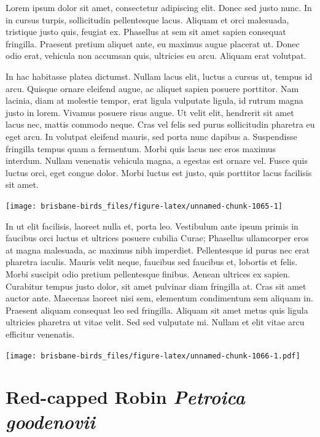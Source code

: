 \documentclass[]{book}
\let\origfigure\figure
\let\endorigfigure\endfigure
\renewenvironment{figure}[1][2] {
  \expandafter\origfigure\expandafter[H]
} {
  \endorigfigure
}
\begin{document}
Lorem ipsum dolor sit amet, consectetur adipiscing elit. Donec sed justo
nunc. In in cursus turpis, sollicitudin pellentesque lacus. Aliquam et
orci malesuada, tristique justo quis, feugiat ex. Phasellus at sem sit
amet sapien consequat fringilla. Praesent pretium aliquet ante, eu
maximus augue placerat ut. Donec odio erat, vehicula non accumsan quis,
ultricies eu arcu. Aliquam erat volutpat.

In hac habitasse platea dictumst. Nullam lacus elit, luctus a cursus ut,
tempus id arcu. Quisque ornare eleifend augue, ac aliquet sapien posuere
porttitor. Nam lacinia, diam at molestie tempor, erat ligula vulputate
ligula, id rutrum magna justo in lorem. Vivamus posuere risus augue. Ut
velit elit, hendrerit sit amet lacus nec, mattis commodo neque. Cras vel
felis sed purus sollicitudin pharetra eu eget arcu. In volutpat eleifend
mauris, sed porta nunc dapibus a. Suspendisse fringilla tempus quam a
fermentum. Morbi quis lacus nec eros maximus interdum. Nullam venenatis
vehicula magna, a egestas est ornare vel. Fusce quis luctus orci, eget
congue dolor. Morbi luctus est justo, quis porttitor lacus facilisis sit
amet.

\begin{figure}
\texttt{[image: brisbane-birds\_files/figure-latex/unnamed-chunk-1065-1]} \caption{insert figure caption}\label{fig:unnamed-chunk-1065}
\end{figure}

In ut elit facilisis, laoreet nulla et, porta leo. Vestibulum ante ipsum
primis in faucibus orci luctus et ultrices posuere cubilia Curae;
Phasellus ullamcorper eros at magna malesuada, ac maximus nibh
imperdiet. Pellentesque id purus nec erat pharetra iaculis. Mauris velit
neque, faucibus sed faucibus et, lobortis et felis. Morbi suscipit odio
pretium pellentesque finibus. Aenean ultrices ex sapien. Curabitur
tempus justo dolor, sit amet pulvinar diam fringilla at. Cras sit amet
auctor ante. Maecenas laoreet nisi sem, elementum condimentum sem
aliquam in. Praesent aliquam consequat leo sed fringilla. Aliquam sit
amet metus quis ligula ultricies pharetra ut vitae velit. Sed sed
vulputate mi. Nullam et elit vitae arcu efficitur venenatis.

\begin{figure}
\centering
\texttt{[image: brisbane-birds\_files/figure-latex/unnamed-chunk-1066-1.pdf]}
\caption{\label{fig:unnamed-chunk-1066}insert figure caption}
\end{figure}

\section{\texorpdfstring{Red-capped Robin \emph{Petroica
goodenovii}}{Red-capped Robin Petroica goodenovii}}\label{red-capped-robin-petroica-goodenovii}
\end{document}
